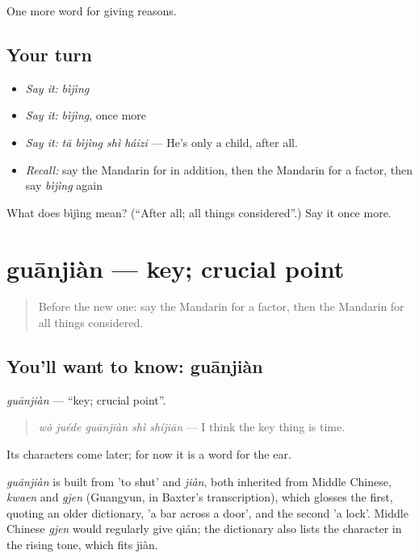 \begin{grammarlens}[title={What you've built}]
One more word for giving reasons.
\end{grammarlens}

\subsection*{Your turn}
\begin{itemize}
\raggedright
  \item \emph{Say it:} \emph{bìjìng}
  \item \emph{Say it:} \emph{bìjìng}, once more
  \item \emph{Say it:} \emph{tā bìjìng shì háizi} — He's only a child, after all.
  \item \emph{Recall:} say the Mandarin for in addition, then the Mandarin for a factor, then say \emph{bìjìng} again
\end{itemize}

\begin{tcolorbox}[breakable,colback=teal!4,colframe=teal!35!black,title={Before you move on}]
What does bìjìng mean? (\textquotedblleft{}After all; all things considered\textquotedblright{}.) Say it once more.
\end{tcolorbox}
\section[guānjiàn]{guānjiàn — key; crucial point}

\label{lesson:ZH-C370-guanjian}



\begin{quote}
Before the new one: say the Mandarin for a factor, then the Mandarin for all things considered.
\end{quote}

\subsection*{You'll want to know: guānjiàn}
\emph{guānjiàn} — \textquotedblleft{}key; crucial point\textquotedblright{}.

\begin{quote}
\emph{wǒ juéde guānjiàn shì shíjiān} — I think the key thing is time.
\end{quote}

Its characters come later; for now it is a word for the ear.

\begin{cousinweb}
\emph{guānjiàn} is built from  'to shut' and \emph{jiàn}, both inherited from Middle Chinese, \emph{kwaen} and \emph{gjen} (Guangyun, in Baxter's transcription), which glosses the first, quoting an older dictionary, 'a bar across a door', and the second 'a lock'. Middle Chinese \emph{gjen} would regularly give qián; the dictionary also lists the character in the rising tone, which fits jiàn.
\end{cousinweb}

